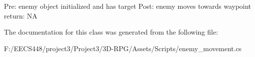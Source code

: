 Pre\+: enemy object initialized and has target Post\+: enemy moves towards waypoint return\+: NA 

The documentation for this class was generated from the following file\+:\begin{DoxyCompactItemize}
\item 
F\+:/\+E\+E\+C\+S448/project3/\+Project3/3\+D-\/\+R\+P\+G/\+Assets/\+Scripts/enemy\+\_\+movement.\+cs\end{DoxyCompactItemize}
